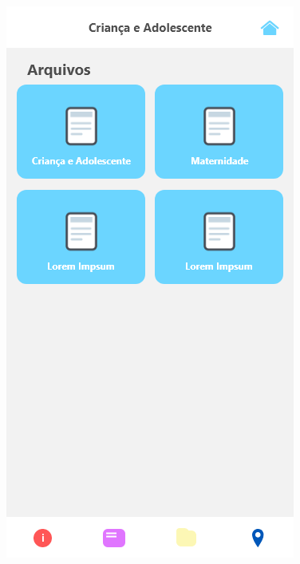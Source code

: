 \documentclass[
	12pt,				%
	openright,			%
	oneside,			%
	a4paper,			%
	english,			%
	brazil,				%
	]{abntex2}
\theoremstyle{theorem}
\theoremstyle{definition}
\begin{document}
\begin{figure}[H]
\centering
\begin{minipage}{.3\textwidth}
      \centering
    \includegraphics[width=.9\linewidth]{imagens/prototipoArquivos.png}
    \label{fig: Tela de arquivos}
\end{minipage}
\begin{minipage}{.3\textwidth}
  \centering

\end{minipage}
\end{figure}
\end{document}
